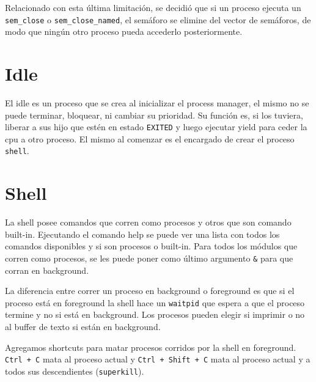 \documentclass{article}
\begin{document}
Relacionado con esta última limitación, se decidió que si un proceso ejecuta un \texttt{sem\_close} o \texttt{sem\_close\_named}, el semáforo se elimine del vector de semáforos, de modo que ningún otro proceso pueda accederlo posteriormente. 

\section {Idle}
El idle es un proceso que se crea al inicializar el process manager, el mismo no se puede terminar, bloquear, ni cambiar su prioridad. Su función es, si los tuviera, liberar a sus hijo que estén en estado \texttt{EXITED} y luego ejecutar yield para ceder la cpu a otro proceso. El mismo al comenzar es el encargado de crear el proceso \texttt{shell}.

\section {Shell}
La shell posee comandos que corren como procesos y otros que son comando built-in. Ejecutando el comando help se puede ver una lista con todos los comandos disponibles y si son procesos o built-in. Para todos los módulos que corren como procesos, se les puede poner como último argumento \texttt{\&} para que corran en background.

La diferencia entre correr un proceso en background o foreground es que si el proceso está en foreground la shell hace un \texttt{waitpid} que espera a que el proceso termine y no si está en background. Los procesos pueden elegir si imprimir o no al buffer de texto si están en background.

Agregamos shortcuts para matar procesos corridos por la shell en foreground. \texttt{Ctrl + C} mata al proceso actual y \texttt{Ctrl + Shift + C} mata al proceso actual y a todos sus descendientes (\texttt{superkill}).
\end{document}
